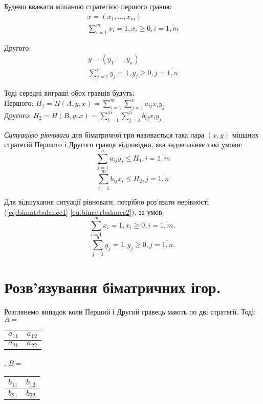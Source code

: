 \documentclass[12pt,a4paper]{book}
\begin{document}
Будемо вважати мішаною стратегією першого гравця:
\[\begin{array}{l}
x = (x_1, \dots, x_m)\\
\sum_{i=1}^m x_i = 1, x_i \geq 0, i = \overline{1,m}
\end{array}\]

Другого:
\[\begin{array}{l}
y = (y_1, \dots, y_n)\\
\sum_{j=1}^n y_j = 1, y_j \geq 0, j = \overline{1,n}
\end{array}\]

Тоді середні виграші обох гравців будуть:\\
Першого: $\displaystyle H_1=H(A,y,x)=\sum_{i=1}^m \sum_{j=1}^n a_{ij} x_i y_j$\\
Другого: $\displaystyle H_2=H(B,y,x)=\sum_{i=1}^m \sum_{j=1}^n b_{ij} x_i y_j$

\emph{Ситуацією рівноваги} для біматричної гри називається така пара $(x,y)$ мішаних стратегій Першого і Другого гравця відповідно, яка задовольняє такі умови:
\begin{equation} \sum_{j=1}^n a_{ij} y_j \leq H_1, i=\overline{1,m} \label{eq:bimatrbalance1}\end{equation}
\begin{equation} \sum_{i=1}^m b_{ij} x_i \leq H_2, j=\overline{1,n} \label{eq:bimatrbalance2}\end{equation}

Для відшукання ситуації рівноваги, потрібно роз’язати нерівності (\ref{eq:bimatrbalance1}-\ref{eq:bimatrbalance2}), за умов:
\[ \sum_{i=1}^m x_i = 1, x_i \geq 0, i = \overline{1,m}, \]
\[ \sum_{j=1}^n y_j = 1, y_j \geq 0, j = \overline{1,n}. \]

\clearpage

\section{Розв'язування біматричних ігор.}

Розглянемо випадок коли Перший і Другий гравець мають по дві стратегії. Тоді:\\
$A =$
\begin{tabular}{|c|c|}
\hline
$a_{1 1}$&$a_{1 2}$\\
\hline
$a_{2 1}$&$a_{2 2}$\\
\hline
\end{tabular},
$B =$
\begin{tabular}{|c|c|}
\hline
$b_{1 1}$&$b_{1 2}$\\
\hline
$b_{2 1}$&$b_{2 2}$\\
\hline
\end{tabular}
\end{document}
